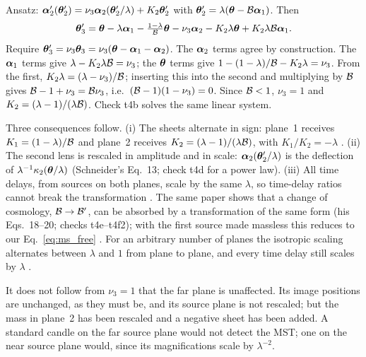 \begin{derivation}
Ansatz: $\boldsymbol{\alpha}_2'(\boldsymbol{\theta}_2')=\nu_3\boldsymbol{\alpha}_2(\boldsymbol{\theta}_2'/\lambda)+K_2\boldsymbol{\theta}_2'$
with $\boldsymbol{\theta}_2'=\lambda(\boldsymbol{\theta}-\mathcal{B}\boldsymbol{\alpha}_1)$.  Then
\[
\boldsymbol{\theta}_3'=\boldsymbol{\theta}-\lambda\boldsymbol{\alpha}_1-\tfrac{1-\lambda}{\mathcal{B}}\boldsymbol{\theta}
-\nu_3\boldsymbol{\alpha}_2-K_2\lambda\boldsymbol{\theta}+K_2\lambda\mathcal{B}\boldsymbol{\alpha}_1 .
\]
Require $\boldsymbol{\theta}_3'=\nu_3\boldsymbol{\theta}_3=\nu_3(\boldsymbol{\theta}-\boldsymbol{\alpha}_1-\boldsymbol{\alpha}_2)$.
The $\boldsymbol{\alpha}_2$ terms agree by construction.  The $\boldsymbol{\alpha}_1$ terms give
$\lambda-K_2\lambda\mathcal{B}=\nu_3$; the $\boldsymbol{\theta}$ terms give
$1-(1-\lambda)/\mathcal{B}-K_2\lambda=\nu_3$.  From the first,
$K_2\lambda=(\lambda-\nu_3)/\mathcal{B}$; inserting this into the second and
multiplying by $\mathcal{B}$ gives $\mathcal{B}-1+\nu_3=\mathcal{B}\nu_3$, i.e.\
$(\mathcal{B}-1)(1-\nu_3)=0$.  Since $\mathcal{B}<1$, $\nu_3=1$ and
$K_2=(\lambda-1)/(\lambda\mathcal{B})$.  Check t4b solves the same linear system.
\end{derivation}

Three consequences follow.  (i) The sheets alternate in sign: plane~1 receives
$K_1=(1-\lambda)/\mathcal{B}$ and plane~2 receives $K_2=(\lambda-1)/(\lambda\mathcal{B})$,
with $K_1/K_2=-\lambda$ \annot{check t4c; Problem~\ref{ex:ms_schneider}}.  (ii) The
second lens is rescaled in amplitude and in scale:
$\boldsymbol{\alpha}_2(\boldsymbol{\theta}_2'/\lambda)$ is the deflection of
$\lambda^{-1}\kappa_2(\boldsymbol{\theta}/\lambda)$ (Schneider's Eq.~13; check t4d for a
power law).  (iii) All time delays, from sources on both planes, scale by the
same $\lambda$, so time-delay ratios cannot break the transformation
\citep{schneider_2014_multiplane}.  The same paper shows that a change of
cosmology, $\mathcal{B}\to\mathcal{B}'$, can be absorbed by a transformation of the same
form (his Eqs.~18--20; checks t4e--t4f2); with the first source made massless
this reduces to our Eq.~\eqref{eq:ms_free} \annot{check t4g}.  For an arbitrary
number of planes the isotropic scaling alternates between $\lambda$ and $1$
from plane to plane, and every time delay still scales by $\lambda$
\citep{schneider_2019_generalized}.

\begin{annotation}
It does not follow from $\nu_3=1$ that the far plane is unaffected.  Its image
positions are unchanged, as they must be, and its source plane is not
rescaled; but the mass in plane~2 has been rescaled and a negative sheet has
been added.  A standard candle on the far source plane would not detect the
MST; one on the near source plane would, since its magnifications scale by
$\lambda^{-2}$.
\end{annotation}


